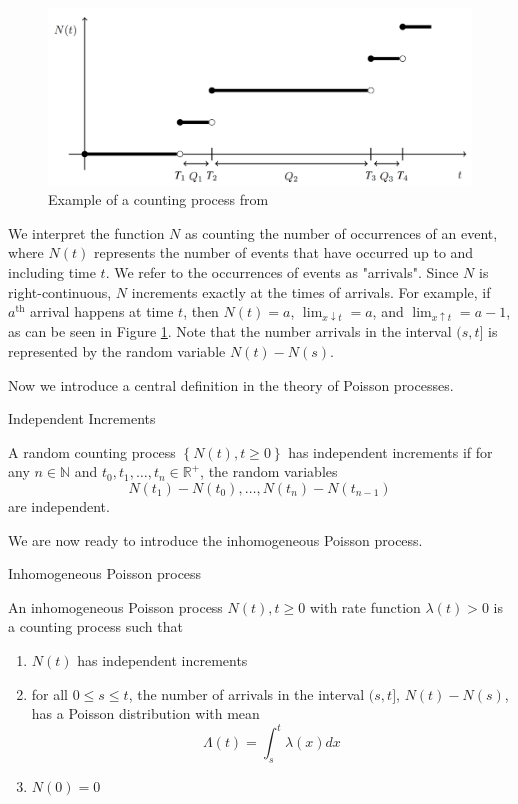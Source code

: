 \begin{figure}[h]
	\centering
	\includegraphics[width=\textwidth]{./figures/poisson_process_example.png}
	\caption{Example of a counting process from \cite{countingProcessFigure}}
	\label{fig:poissonProcessExample}
\end{figure}

We interpret the function $N$ as counting the number of occurrences of an event, where $N(t)$ represents the number of events that have occurred up to and including time $t$. We refer to the occurrences of events as "arrivals".  Since $N$ is right-continuous, $N$ increments exactly at the times of arrivals. For example, if $a^\text{th}$ arrival happens at time $t$, then $N(t) = a$, $\lim_{x \downarrow t} = a$, and $\lim_{x \uparrow t} = a - 1$, as can be seen in Figure \ref{fig:poissonProcessExample}. Note that the number arrivals in the interval $(s, t]$ is represented by the random variable $N(t) - N(s)$. 

Now we introduce a central definition in the theory of Poisson processes.

\begin{definition}
	Independent Increments

	A random counting process $\left\{ N(t), t \geq 0 \right\}$ has independent increments if for any $n \in \mathbb{N}$ and $t_0, t_1, \dots, t_n \in \mathbb{R}^{+}$,
	the random variables
	$$
		N(t_1) - N(t_0), \dots, N(t_n) - N(t_{n - 1})
	$$
	are independent.
\end{definition}

We are now ready to introduce the inhomogeneous Poisson process.

\begin{definition}\label{defn:inhomoPP}
	Inhomogeneous Poisson process

	\noindent
	An inhomogeneous Poisson process ${N(t), t \geq 0}$ with rate function $\lambda(t) > 0$ is a counting process such that
	\begin{enumerate}
		\item $N(t)$ has independent increments
		\item for all $0 \leq s \leq t$, 
		the number of arrivals in the interval $(s, t]$, 
		$N(t) - N(s)$, has a Poisson distribution with mean
		$$
			\Lambda(t) = \int_s^t \lambda(x) dx
		$$
		\item $N(0) = 0$
	\end{enumerate}
\end{definition}

